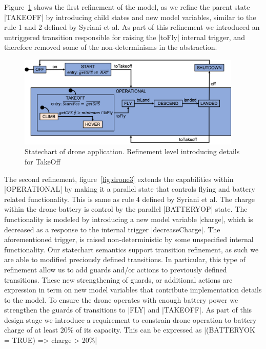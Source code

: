 Figure~\ref{fig:drone2} shows the first refinement of the model, as we refine the parent state |TAKEOFF|
by introducing child states and new model variables, similar to the rule 1 and 2 defined by Syriani et al.
As part of this refinement we introduced an untriggered transition responsible for 
raising the |toFly| internal trigger, and therefore removed some of the non-determinisms in the abstraction.

\begin{figure}[!h]
	\centering
	\includegraphics[width=0.95\textwidth]{figures/Picture2.png}
	\caption{Statechart of drone application. Refinement level introducing details for TakeOff}
	\label{fig:drone2}
\end{figure} 

The second refinement, figure~\ref{fig:drone3} extends the capabilities within |OPERATIONAL| by making it a parallel
state that controls flying and battery related functionality. This is same as rule 4 defined by Syriani et al.
The charge within the drone battery is control by the parallel |BATTERYOP| state. 
The functionality is modeled by introducing a new model variable |charge|, which is decreased as 
a response to the internal trigger |decreaseCharge|. The aforementioned trigger, is raised non-deterministic by some 
unspecified internal functionality. Our statechart semantics support transition refinement, as such
we are able to modified preciously defined transitions. In particular, this type of refinement allow
us to add guards and/or actions to previously defined transitions. These new strengthening of guards, or additional 
actions are expression in term on new model variables that contribute implementation details to the model.
To ensure the drone operates with enough battery power we strengthen the guards of transitions to |FLY| and |TAKEOFF|.
As part of this design stage we introduce a requirement to constrain drone operation to battery charge of 
at least 20\% of its capacity. This can be expressed as |(BATTERYOK = TRUE) => charge > 20\%|

